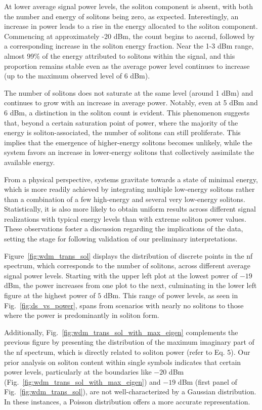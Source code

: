 At lower average signal power levels, the soliton component is absent, with both the number and energy of solitons being zero, as expected. Interestingly, an increase in power leads to a rise in the energy allocated to the soliton component. Commencing at approximately -20 dBm, the count begins to ascend, followed by a corresponding increase in the soliton energy fraction. Near the 1-3 dBm range, almost 99\% of the energy attributed to solitons within the signal, and this proportion remains stable even as the average power level continues to increase (up to the maximum observed level of 6 dBm).

The number of solitons does not saturate at the same level (around 1 dBm) and continues to grow with an increase in average power. Notably, even at 5 dBm and 6 dBm, a distinction in the soliton count is evident. This phenomenon suggests that, beyond a certain saturation point of power, where the majority of the energy is soliton-associated, the number of solitons can still proliferate. This implies that the emergence of higher-energy solitons becomes unlikely, while the system favors an increase in lower-energy solitons that collectively assimilate the available energy.

From a physical perspective, systems gravitate towards a state of minimal energy, which is more readily achieved by integrating multiple low-energy solitons rather than a combination of a few high-energy and several very low-energy solitons. Statistically, it is also more likely to obtain uniform results across different signal realizations with typical energy levels than with extreme soliton power values. These observations foster a discussion regarding the implications of the data, setting the stage for following validation of our preliminary interpretations.




Figure~\ref{fig:wdm_trans_sol} displays the distribution of discrete points in the \acrshort{nf} spectrum, which corresponds to the number of solitons, across different average signal power levels. Starting with the upper left plot at the lowest power of \(-19\) dBm, the power increases from one plot to the next, culminating in the lower left figure at the highest power of \(5\) dBm. This range of power levels, as seen in Fig.~\ref{fig:ds_vs_power}, spans from scenarios with nearly no solitons to those where the power is predominantly in soliton form.

Additionally, Fig.~\ref{fig:wdm_trans_sol_with_max_eigen} complements the previous figure by presenting the distribution of the maximum imaginary part of the \acrshort{nf} spectrum, which is directly related to soliton power (refer to Eq. 5). Our prior analysis on soliton content within single symbols indicates that certain power levels, particularly at the boundaries like \(-20\) dBm (Fig.~\ref{fig:wdm_trans_sol_with_max_eigen}) and \(-19\) dBm (first panel of Fig.~\ref{fig:wdm_trans_sol}), are not well-characterized by a Gaussian distribution. In these instances, a Poisson distribution offers a more accurate representation.


